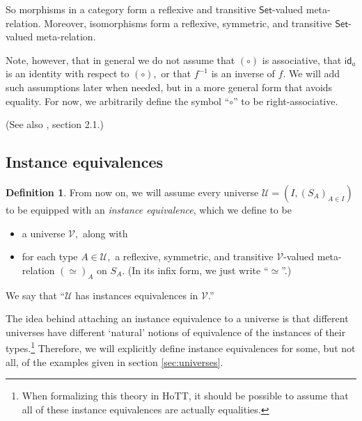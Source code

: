\documentclass[a4paper]{article}
\theoremstyle{definition}
\newtheorem{definition}{Definition}[section]
\theoremstyle{remark}
\newcommand{\defn}{\emph}
\renewcommand{\equiv}{\simeq}
\newcommand{\U}{\mathcal{U}}
\newcommand{\V}{\mathcal{V}}
\newcommand{\nm}{\mathsf}
\newcommand{\universe}{\nm}
\newcommand{\Set}{\universe{Set}}
\newcommand{\id}{\nm{id}}
\begin{document}
So morphisms in a category form a reflexive and transitive $\Set$-valued meta-relation.
Moreover, isomorphisms form a reflexive, symmetric, and transitive $\Set$-valued meta-relation.

Note, however, that in general we do not assume that $(\circ)$ is associative, that $\id_a$ is
an identity with respect to $(\circ),$ or that $f^{-1}$ is an inverse of $f.$ We will add such
assumptions later when needed, but in a more general form that avoids equality. For now, we
arbitrarily define the symbol ``$\circ$'' to be right-associative.

(See also \cite{hottbook}, section 2.1.)

\subsection{Instance equivalences}

\begin{definition}
  From now on, we will assume every universe $\U = (I, (S_A)_{A \in I})$ to be equipped with an
  \defn{instance equivalence}, which we define to be
  \begin{itemize}
    \item a universe $\V,$ along with
    \item for each type $A \in \U,$ a reflexive, symmetric, and transitive $\V$-valued
    meta-relation $(\equiv)_A$ on $S_A.$ (In its infix form, we just write ``$\equiv$''.)
  \end{itemize}
\end{definition}

We say that ``$\U$ has instances equivalences in $\V$.''

The idea behind attaching an instance equivalence to a universe is that different universes
have different `natural' notions of equivalence of the instances of their
types.\footnote{When formalizing this theory in HoTT, it should be possible to assume that
all of these instance equivalences are actually equalities.}
Therefore, we will explicitly define instance equivalences for some, but not all, of the
examples given in section \ref{sec:universes}.
\end{document}
